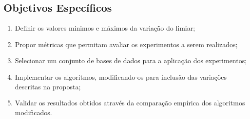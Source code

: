    \subsection{Objetivos Específicos}
        \label{subsec:objetivos-especificos}
        \begin{enumerate}[label=\alph*)]
            \item Definir os valores mínimos e máximos da variação do limiar; %
            \item Propor métricas que permitam avaliar os experimentos a serem realizados; %
            \item Selecionar um conjunto de bases de dados para a aplicação dos experimentos;
            \item Implementar os algoritmos, modificando-os para inclusão das variações descritas na proposta;
            
            \item Validar os resultados obtidos através da comparação empírica dos algoritmos modificados.
        \end{enumerate}